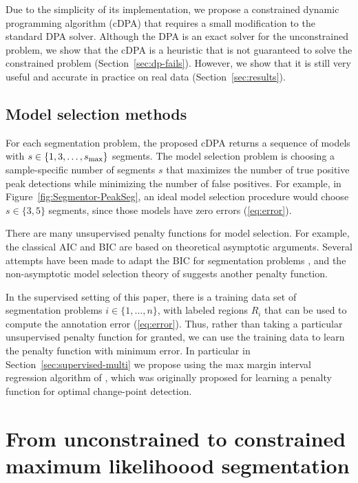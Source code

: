\documentclass{article}
\begin{document}
Due to the simplicity of its implementation, we propose a constrained
dynamic programming algorithm (cDPA) that requires a small
modification to the standard DPA solver. Although the DPA is an exact
solver for the unconstrained problem, we show that the cDPA is a
heuristic that is not guaranteed to solve the constrained
problem (Section~\ref{sec:dp-fails}). However, we show that it is
still very useful and accurate in practice on real data
(Section~\ref{sec:results}).

\subsection{Model selection methods}

For each segmentation problem, the proposed cDPA returns a sequence of
models with $s\in\{1, 3, \dots, s_{\text{\text{max}}}\}$ segments. The
model selection problem is choosing a sample-specific number of
segments $s$ that maximizes the number of true positive peak
detections while minimizing the number of false positives. For
example, in Figure~\ref{fig:Segmentor-PeakSeg}, an ideal model
selection procedure would choose $s\in\{3, 5\}$ segments, since those
models have zero errors (\ref{eq:error}).

There are many unsupervised penalty functions for model selection. For
example, the classical AIC \citep{Akaike73} and BIC \citep{Schwarz78} are based
on theoretical asymptotic arguments. Several attempts have been made
to adapt the BIC for segmentation problems \citep{Yao88,
  mBIC}, and the non-asymptotic model selection theory of
\citet{cleynen2013segmentation} suggests another penalty function.

In the supervised setting of this paper, there is a training data set
of segmentation problems $i\in\{1, \dots, n\}$, with labeled regions
$R_i$ that can be used to compute the annotation error
(\ref{eq:error}). Thus, rather than taking a particular unsupervised
penalty function for granted, we can use the training data to learn
the penalty function with minimum error. In particular in
Section~\ref{sec:supervised-multi} we propose using the max margin interval
regression algorithm of \citet{HOCKING-penalties}, which was
originally proposed for learning a penalty function for optimal
change-point detection.

\section{From unconstrained to constrained maximum likelihoood
  segmentation}
\label{sec:model}
\end{document}

